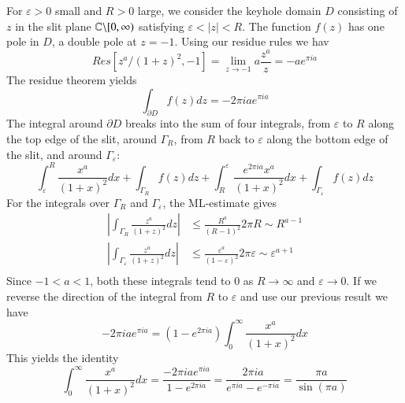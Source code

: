 \documentclass[12pt, a4paper, oneside, openright, titlepage]{book}
\begin{document}
For $\varepsilon > 0$ small and $R > 0$ large, we consider the keyhole domain $D$ consisting of $z$ in the slit plane $\mathbb C\backslash[0,\infty)$ satisfying $\varepsilon < |z| < R$. The function $f(z)$ has one pole in $D$, a double pole at $z = -1$. Using our residue rules we hav \begin{equation*}
    Res[z^a/(1+z)^2,-1] = \lim\limits_{z\rightarrow -1}a\frac{z^a}{z} = -ae^{\pi ia}
\end{equation*}
The residue theorem yields \begin{equation*}
    \int_{\partial D}f(z)dz = -2\pi iae^{\pi ia}
\end{equation*}
The integral around $\partial D$ breaks into the sum of four integrals, from $\varepsilon$ to $R$ along the top edge of the slit, around $\Gamma_R$, from $R$ back to $\varepsilon$ along the bottom edge of the slit, and around $\Gamma_{\varepsilon}$: \begin{equation*}
    \int_{\varepsilon}^R\frac{x^a}{(1+x)^2}dx + \int_{\Gamma_R}f(z)dz+\int_R^{\varepsilon}\frac{e^{2\pi ia}x^a}{(1+x)^2}dx+\int_{\Gamma_{\varepsilon}}f(z)dz
\end{equation*}
For the integrals over $\Gamma_R$ and $\Gamma_{\varepsilon}$, the ML-estimate gives \begin{align*}
    \left|\int_{\Gamma_R}\frac{z^a}{(1+z)^2}dz\right| &\leq \frac{R^a}{(R-1)^2}2\pi R\sim R^{a-1} \\
    \left|\int_{\Gamma_{\varepsilon}}\frac{z^a}{(1+z)^2}dz\right| &\leq \frac{\varepsilon^a}{(1-\varepsilon)^2}2\pi \varepsilon\sim \varepsilon^{a+1} \\
\end{align*}
Since $-1 < a < 1$, both these integrals tend to $0$ as $R\rightarrow \infty$ and $\varepsilon \rightarrow 0$. If we reverse the direction of the integral from $R$ to $\varepsilon$ and use our previous result we have \begin{equation*}
    -2\pi iae^{\pi ia} = (1-e^{2\pi ia})\int_{0}^{\infty}\frac{x^a}{(1+x)^2}dx
\end{equation*}
This yields the identity \begin{equation*}
    \int_0^{\infty}\frac{x^a}{(1+x)^2}dx = \frac{-2\pi iae^{\pi ia}}{1-e^{2\pi ia}} = \frac{2\pi ia}{e^{\pi ia}-e^{-\pi ia}} = \frac{\pi a}{\sin(\pi a)}
\end{equation*}
\end{document}
